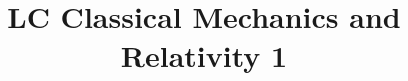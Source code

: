 \documentclass[a4paper]{article}
\title{LC Classical Mechanics and Relativity 1}
\begin{document}
    \maketitle
    \hrulefill
    \tableofcontents
    
    
\end{document}
